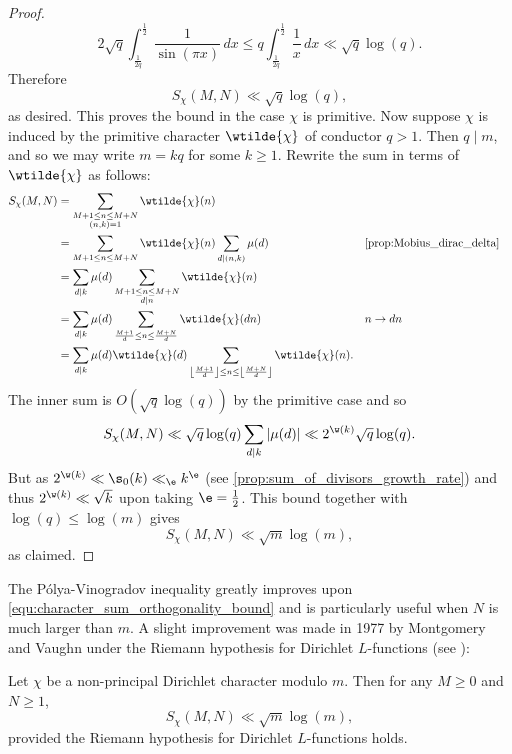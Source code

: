 \begin{proof}
      \[
        2\sqrt{q}\int_{\frac{1}{2q}}^{\frac{1}{2}}\frac{1}{\sin(\pi x)}\,dx \le q\int_{\frac{1}{2q}}^{\frac{1}{2}}\frac{1}{x}\,dx \ll \sqrt{q}\log(q).
      \]
      Therefore
      \[
        S_{\chi}(M,N) \ll \sqrt{q}\log(q),
      \]
      as desired. This proves the bound in the case $\chi$ is primitive. Now suppose $\chi$ is induced by the primitive character $\wtilde{\chi}$ of conductor $q > 1$. Then $q \mid m$, and so we may write $m = kq$ for some $k \ge 1$. Rewrite the sum in terms of $\wtilde{\chi}$ as follows:
      \begin{align*}
        S_{\chi}(M,N) &= \sum_{\substack{M+1 \le n \le M+N \\ (n,k) = 1}}\wtilde{\chi}(n) \\
        &= \sum_{M+1 \le n \le M+N}\wtilde{\chi}(n)\sum_{d \mid (n,k)}\mu(d) && \text{\cref{prop:Mobius_dirac_delta}} \\
        &= \sum_{d \mid k}\mu(d)\sum_{\substack{M+1 \le n \le M+N \\ d \mid n}}\wtilde{\chi}(n) \\
        &= \sum_{d \mid k}\mu(d)\sum_{\frac{M+1}{d} \le n \le \frac{M+N}{d}}\wtilde{\chi}(dn) && \text{$n \to dn$} \\
        &= \sum_{d \mid k}\mu(d)\wtilde{\chi}(d)\sum_{\left\lfloor\frac{M+1}{d}\right\rfloor \le n \le \left\lfloor\frac{M+N}{d}\right\rfloor}\wtilde{\chi}(n).
      \end{align*}
      The inner sum is $O(\sqrt{q}\log(q))$ by the primitive case and so
      \[
        S_{\chi}(M,N) \ll \sqrt{q}\log(q)\sum_{d \mid k}|\mu(d)| \ll 2^{\w(k)}\sqrt{q}\log(q).
      \]
      But as $2^{\w(k)} \ll \s_{0}(k) \ll_{\e} k^{\e}$ (see \cref{prop:sum_of_divisors_growth_rate}) and thus $2^{\w(k)} \ll \sqrt{k}$ upon taking $\e = \frac{1}{2}$. This bound together with $\log(q) \le \log(m)$ gives
      \[
        S_{\chi}(M,N) \ll \sqrt{m}\log(m),
      \]
      as claimed.
    \end{proof}

    The P\'olya-Vinogradov inequality greatly improves upon \cref{equ:character_sum_orthogonality_bound} and is particularly useful when $N$ is much larger than $m$. A slight improvement was made in 1977 by Montgomery and Vaughn under the Riemann hypothesis for Dirichlet $L$-functions (see \cite{montgomery1977exponential}):

    \begin{theorem}\label{thm:MV_bound_character_sum}
      Let $\chi$ be a non-principal Dirichlet character modulo $m$. Then for any $M \ge 0$ and $N \ge 1$,
      \[
        S_{\chi}(M,N) \ll \sqrt{m}\log(m),
      \]
      provided the Riemann hypothesis for Dirichlet $L$-functions holds.
    \end{theorem}
    
